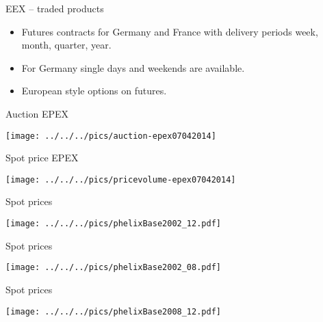 {EEX -- traded products}
\begin{itemize}
\item<1-> Futures contracts for Germany and France with delivery periods week, month, quarter, year.
\item<2-> For Germany single days and weekends are available.
\item<3-> European style options on futures.
\end{itemize}




{Auction EPEX}
\begin{center}
\texttt{[image: ../../../pics/auction-epex07042014]}
\end{center}





{Spot price EPEX}
\begin{center}
\texttt{[image: ../../../pics/pricevolume-epex07042014]}
\end{center}






{Spot prices}
\begin{center}
\texttt{[image: ../../../pics/phelixBase2002\_12.pdf]}
\end{center}





{Spot prices}
\begin{center}
\texttt{[image: ../../../pics/phelixBase2002\_08.pdf]}
\end{center}




{Spot prices}
\begin{center}
\texttt{[image: ../../../pics/phelixBase2008\_12.pdf]}
\end{center}










